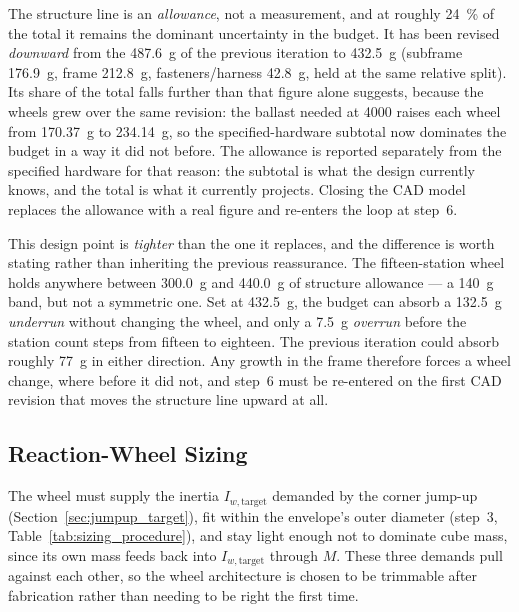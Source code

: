 \begin{table}[htbp]
\vspace{0.4em}
{\footnotesize\RaggedRight The structure line is an \emph{allowance}, not a
measurement, and at roughly \qty{24}{\percent} of the total it remains the
dominant uncertainty in the budget. It has been revised \emph{downward} from
the \qty{487.6}{\gram} of the previous iteration to \qty{432.5}{\gram}
(subframe \qty{176.9}{\gram}, frame \qty{212.8}{\gram}, fasteners/harness
\qty{42.8}{\gram}, held at the same relative split). Its share of the total
falls further than that figure alone suggests, because the wheels grew over
the same revision: the ballast needed at \qty{4000}{\rpm} raises each wheel
from \qty{170.37}{\gram} to \qty{234.14}{\gram}, so the specified-hardware
subtotal now dominates the budget in a way it did not before. The allowance is
reported separately from the specified hardware for that reason: the subtotal
is what the design currently knows, and the total is what it currently
projects. Closing the CAD model replaces the allowance with a real figure and
re-enters the loop at step~6.

\smallskip
This design point is \emph{tighter} than the one it replaces, and the
difference is worth stating rather than inheriting the previous reassurance.
The fifteen-station wheel holds anywhere between \qty{300.0}{\gram} and
\qty{440.0}{\gram} of structure allowance --- a \qty{140}{\gram} band, but not
a symmetric one. Set at \qty{432.5}{\gram}, the budget can absorb a
\qty{132.5}{\gram} \emph{underrun} without changing the wheel, and only a
\qty{7.5}{\gram} \emph{overrun} before the station count steps from fifteen to
eighteen. The previous iteration could absorb roughly \qty{77}{\gram} in
either direction. Any growth in the frame therefore forces a wheel change,
where before it did not, and step~6 must be re-entered on the first CAD
revision that moves the structure line upward at all.\par}
\end{table}

\subsection{Reaction-Wheel Sizing}
\label{sec:rw_sizing}

The wheel must supply the inertia $I_{w,\text{target}}$ demanded by the corner
jump-up (Section~\ref{sec:jumpup_target}), fit within the envelope's outer
diameter (step~3, Table~\ref{tab:sizing_procedure}), and stay light enough not
to dominate cube mass, since its own mass feeds back into $I_{w,\text{target}}$
through $M$. These three demands pull against each other, so the wheel
architecture is chosen to be trimmable after fabrication rather than needing
to be right the first time.

